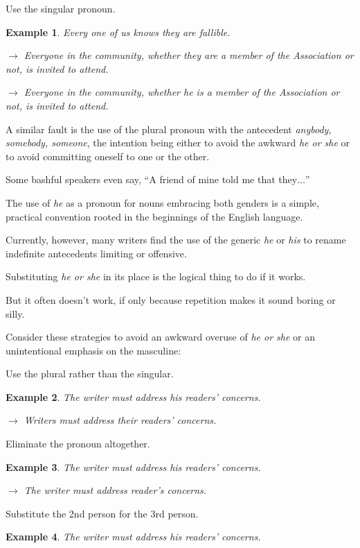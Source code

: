 \documentclass{book}
\numberwithin{equation}{section}
\newtheorem{example}{Example}[chapter]
\begin{document}
\begin{enumerate}
    Use the singular pronoun.
    \begin{example}
        Every one of us knows they are fallible.
        
        $\to$ Everyone in the community, whether they are a member of the Association or not, is invited to attend.
        
        $\to$ Everyone in the community, whether he is a member of the Association or not, is invited to attend.
    \end{example}
    A similar fault is the use of the plural pronoun with the antecedent \textit{anybody, somebody, someone}, the intention being either to avoid the awkward \textit{he or she} or to avoid committing oneself to one or the other.
    
    Some bashful speakers even say, ``A friend of mine told me that they$\ldots$''
    
    The use of \textit{he} as a pronoun for nouns embracing both genders is a simple, practical convention rooted in the beginnings of the English language.
    
    Currently, however, many writers find the use of the generic \textit{he} or \textit{his} to rename indefinite antecedents limiting or offensive.
    
    Substituting \textit{he or she} in its place is the logical thing to do if it works.
    
    But it often doesn't work, if only because repetition makes it sound boring or silly.
    
    Consider these strategies to avoid an awkward overuse of \textit{he or she} or an unintentional emphasis on the masculine:
    
    Use the plural rather than the singular.
    \begin{example}
        The writer must address his readers' concerns.
        
        $\to$ Writers must address their readers' concerns.
    \end{example}
    Eliminate the pronoun altogether.
    \begin{example}
        The writer must address his readers' concerns.
        
        $\to$ The writer must address reader's concerns.
    \end{example}
    Substitute the 2nd person for the 3rd person.
    \begin{example}
        The writer must address his readers' concerns.
        

\end{example}
\end{enumerate}
\end{document}
